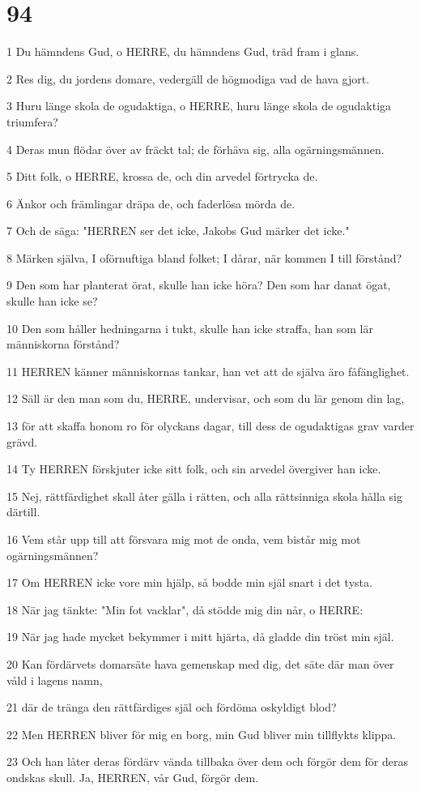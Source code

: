 \chapter{94}

\par 1 Du hämndens Gud, o HERRE, du hämndens Gud, träd fram i glans.
\par 2 Res dig, du jordens domare, vedergäll de högmodiga vad de hava gjort.
\par 3 Huru länge skola de ogudaktiga, o HERRE, huru länge skola de ogudaktiga triumfera?
\par 4 Deras mun flödar över av fräckt tal; de förhäva sig, alla ogärningsmännen.
\par 5 Ditt folk, o HERRE, krossa de, och din arvedel förtrycka de.
\par 6 Änkor och främlingar dräpa de, och faderlösa mörda de.
\par 7 Och de säga: "HERREN ser det icke, Jakobs Gud märker det icke."
\par 8 Märken själva, I oförnuftiga bland folket; I dårar, när kommen I till förstånd?
\par 9 Den som har planterat örat, skulle han icke höra? Den som har danat ögat, skulle han icke se?
\par 10 Den som håller hedningarna i tukt, skulle han icke straffa, han som lär människorna förstånd?
\par 11 HERREN känner människornas tankar, han vet att de själva äro fåfänglighet.
\par 12 Säll är den man som du, HERRE, undervisar, och som du lär genom din lag,
\par 13 för att skaffa honom ro för olyckans dagar, till dess de ogudaktigas grav varder grävd.
\par 14 Ty HERREN förskjuter icke sitt folk, och sin arvedel övergiver han icke.
\par 15 Nej, rättfärdighet skall åter gälla i rätten, och alla rättsinniga skola hålla sig därtill.
\par 16 Vem står upp till att försvara mig mot de onda, vem bistår mig mot ogärningsmännen?
\par 17 Om HERREN icke vore min hjälp, så bodde min själ snart i det tysta.
\par 18 När jag tänkte: "Min fot vacklar", då stödde mig din når, o HERRE:
\par 19 När jag hade mycket bekymmer i mitt hjärta, då gladde din tröst min själ.
\par 20 Kan fördärvets domarsäte hava gemenskap med dig, det säte där man över våld i lagens namn,
\par 21 där de tränga den rättfärdiges själ och fördöma oskyldigt blod?
\par 22 Men HERREN bliver för mig en borg, min Gud bliver min tillflykts klippa.
\par 23 Och han låter deras fördärv vända tillbaka över dem och förgör dem för deras ondskas skull. Ja, HERREN, vår Gud, förgör dem.

